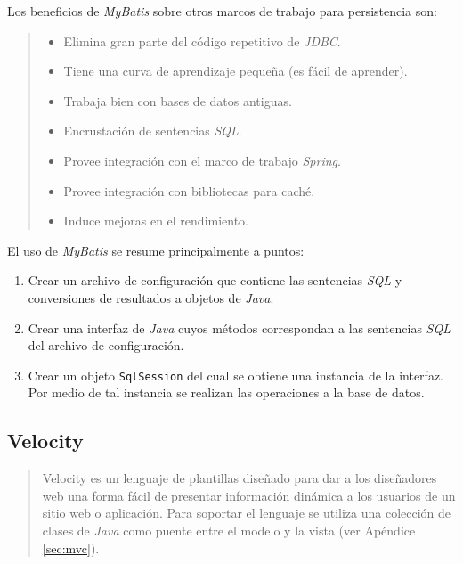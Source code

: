 Los beneficios de \textit{MyBatis} sobre otros marcos de trabajo para persistencia son\cite{PersistenceWithMyBatis}:
\begin{quote}
	\begin{itemize}
		\item Elimina gran parte del código repetitivo de \textit{JDBC}.
		\item Tiene una curva de aprendizaje pequeña (es fácil de aprender).
		\item Trabaja bien con bases de datos antiguas.
		\item Encrustación de sentencias \textit{SQL}.
		\item Provee integración con el marco de trabajo \textit{Spring}.
		\item Provee integración con bibliotecas para caché.
		\item Induce mejoras en el rendimiento.
	\end{itemize}
\end{quote}

El uso de \textit{MyBatis} se resume principalmente a puntos\cite{PersistenceWithMyBatis}:
\begin{enumerate}
	\item Crear un archivo de configuración que contiene las sentencias \textit{SQL} y conversiones de resultados a objetos de \textit{Java}.
	\item Crear una interfaz de \textit{Java} cuyos métodos correspondan a las sentencias \textit{SQL} del archivo de configuración.
	\item Crear un objeto \texttt{SqlSession} del cual se obtiene una instancia de la interfaz. Por medio de tal instancia se realizan las operaciones a la base de datos.
\end{enumerate}

\subsection{Velocity}\label{sec:velocity}
\begin{quote}
	Velocity es un lenguaje de plantillas diseñado para dar a los diseñadores web una forma fácil de presentar información dinámica a los usuarios de un sitio web o aplicación. Para soportar el lenguaje se utiliza una colección de clases de \textit{Java} como puente entre el modelo y la vista\cite{MasteringApacheVelocity} (ver Apéndice \ref{sec:mvc}).
\end{quote}

